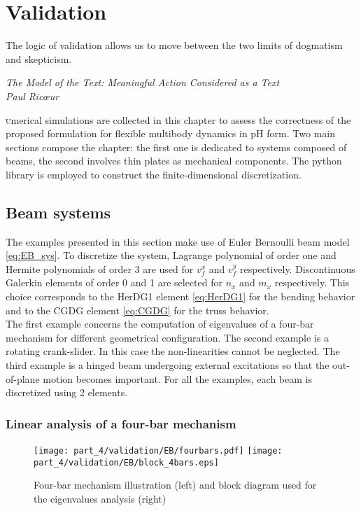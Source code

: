 \chapter{Validation}\label{ch:valid}

\epigraph{The logic of validation allows us to move between the two limits of dogmatism and skepticism.}{\textit{The Model of the Text: Meaningful Action Considered as a Text\\
Paul Ric\oe{}ur}}

\minitoc

\lettrine{\color{theme}{N}}umerical simulations are collected in this chapter to assess the correctness of the proposed formulation for flexible multibody dynamics in pH form. Two main sections compose the chapter: the first one is dedicated to systems composed of beams, the second involves  thin plates as mechanical components. The {} python library \cite{rathgeber2017firedrake} is employed to construct the finite-dimensional discretization.

\section{Beam systems}
The examples presented in this section make use of Euler Bernoulli beam model \eqref{eq:EB_sys}. To discretize the system, Lagrange polynomial of order one and Hermite polynomials of order 3 are used for $v_f^x$ and $v_f^y$ respectively. Discontinuous Galerkin elements of order 0 and 1 are selected for $n_x$ and $m_{x}$ respectively. This choice corresponds to the HerDG1 element \eqref{eq:HerDG1} for the bending behavior and to the CGDG element \eqref{eq:CGDG} for the truss behavior.  \\
 
The first example concerns the computation of eigenvalues of a four-bar mechanism for different geometrical configuration. The second example is a rotating crank-slider. In this case the non-linearities cannot be neglected. The third example is a hinged beam undergoing external excitations so that the out-of-plane motion becomes important. For all the examples, each beam is discretized using 2 elements. 


\subsection{Linear analysis of a four-bar mechanism}

\begin{figure}[tb]
	\centering
	\texttt{[image: part\_4/validation/EB/fourbars.pdf]} 
	\hspace{.3cm}
	\texttt{[image: part\_4/validation/EB/block\_4bars.eps]} 
	\caption{Four-bar mechanism illustration (left) and block diagram used for the eigenvalues analysis (right)}
	\label{fig:4bars}
\end{figure}

